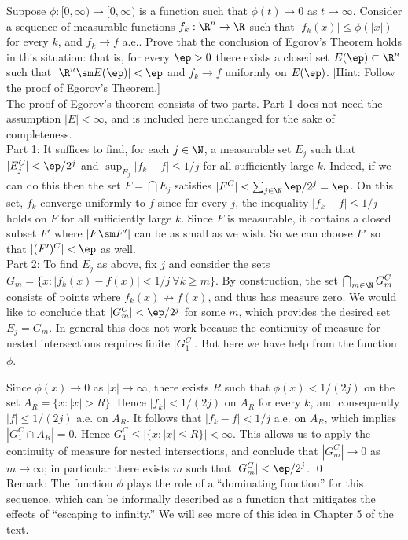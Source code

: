 \begin{hwsol}
Suppose $\phi \colon [0, \infty) \to [0,\infty)$ is a function such that $\phi(t) \to 0$ as $t \to \infty$. Consider a sequence of measurable functions $f_k: \R^n \to \R$ such that $|f_k(x)|\leq \phi(|x|)$ for every $k$, and $f_k \to f$ a.e.. Prove that the conclusion of Egorov's Theorem holds in this situation: that is, for every $\ep>0$ there exists a closed set $E(\ep) \subset \R^n$ such that $|\R^n \sm E(\ep)| < \ep$ and $f_k \to f$ uniformly on $E(\ep)$.  [Hint: Follow the proof of Egorov's Theorem.] \\

\pf The proof of Egorov's theorem consists of two parts. Part 1 does not need the assumption $|E| < \infty$, and is included here unchanged for the sake of completeness. \\

\noindent Part 1: It suffices to find, for each $j \in \N$, a measurable set $E_j$ such that $|E_j^C| < \ep/2^j$ and $\sup_{E_j} |f_k-f| \leq 1/j$ for all sufficiently large $k$. Indeed, if we can do this then the set $F= \bigcap E_j$ satisfies $|F^C|< \sum_{j \in \N} \ep/2^j= \ep$. On this set, $f_k$ converge uniformly to $f$ since for every $j$, the inequality $|f_k-f| \leq 1/j$ holds on $F$ for all sufficiently large $k$. Since $F$ is measurable, it contains a closed subset $F'$ where $|F \sm F'|$ can be as small as we wish. So we can choose $F'$ so that $|(F')^C| < \ep$ as well. \\

\noindent Part 2: To find $E_j$ as above, fix $j$ and consider the sets $G_m = \{ x \colon |f_k(x) - f(x)| < 1/j \ \forall k \geq m\}$. By construction, the set $\bigcap_{m \in \N} G_m^C$ consists of points where $f_k(x) \not\to f(x)$, and thus has measure zero. We would like to conclude that $|G_m^C| < \ep/2^j$ for some $m$, which provides the desired set $E_j= G_m$.  In general this does not work because the continuity of measure for nested intersections requires finite $|G_1^C|$. But here we have help from the function $\phi$. 

Since $\phi(x) \to 0$ as $|x| \to \infty$, there exists $R$ such that $\phi(x) < 1/(2j)$ on the set $A_R= \{ x \colon  |x| > R \}$. Hence $|f_k| < 1/(2j)$ on $A_R$ for every $k$, and consequently $|f| \leq 1/(2j)$ a.e. on $A_R$. It follows that $|f_k-f| < 1/j$ a.e. on $A_R$, which implies  $|G_1^C \cap A_R|= 0$. Hence $G_1^C \leq |\{ x \colon |x| \leq R \}| < \infty$. This allows us to apply the continuity of measure for nested intersections, and conclude that $|G_m^C| \to 0$ as $m \to \infty$; in particular there exists $m$ such that $|G_m^C|< \ep/2^j$. \qed \\

\noindent Remark: The function $\phi$ plays the role of a  ``dominating  function'' for this sequence, which can be informally described as a function that mitigates the effects of ``escaping to infinity.'' We will see more of this idea in Chapter 5 of the text. \\
\end{hwsol}


